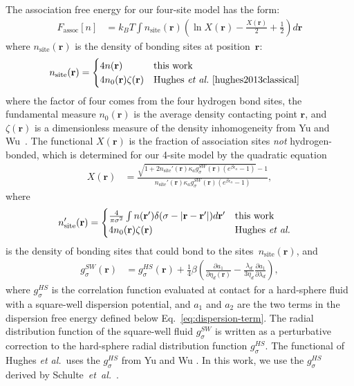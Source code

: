 \documentclass[twocolumn,amsmath,amssymb]{revtex4-1}
\newcommand{\rr}{\textbf{r}}
\newcommand{\xx}{\textbf{r}}
\newcommand\etadisp{\ensuremath{\eta_\textit{d}}}
\newcommand\epsilonassoc{\ensuremath{\epsilon_\textit{a}}}
\newcommand\kappaassoc{\ensuremath{\kappa_\textit{a}}}
\newcommand\lambdadisp{\ensuremath{\lambda_\textit{d}}}
\newcommand\hughesetal{Hughes \emph{et al.}}
\newcommand\hughesetalcite{Hughes \emph{et al.}~\cite{hughes2013classical}}
\begin{document}
The association free energy for our four-site model has the form:
\begin{align}
  F_\text{assoc}[n] &= k_BT \int n_\text{site}(\xx)
  \left(\ln X(\xx) - \frac{X(\xx)}{2} + \frac12\right) d\xx
\end{align}
where $n_\text{site}(\rr)$ is the density of bonding sites at
position~$\rr$:
\begin{align}
  n_\text{site}(\rr) &=
  \begin{cases}
    4 n(\rr) & \text{this work}\\
    4 n_0(\rr) \zeta(\rr) & \text{\hughesetalcite}
  \end{cases}
\end{align}
where the factor of four comes from the four hydrogen bond sites, the
fundamental measure $n_0(\rr)$ is the average density contacting point
$\rr$, and $\zeta(\xx)$ is a dimensionless measure of the density
inhomogeneity from Yu and
Wu~\cite{yu2002fmt-dft-inhomogeneous-associating}.  The functional
$X(\rr)$ is the fraction of association sites \emph{not}
hydrogen-bonded, which is determined for our 4-site model by the
quadratic equation
\begin{align}
  X(\xx) &= \frac{\sqrt{1 + 2n_\text{site}'(\rr)
      \kappaassoc g^\textit{SW}_\sigma(\xx)
  \left(e^{\beta\epsilonassoc} - 1\right)} - 1}
  {n_\text{site}'(\rr)
    \kappaassoc g^\textit{SW}_\sigma(\xx)
  \left(e^{\beta\epsilonassoc} - 1\right)}, \label{eq:X}
\end{align}
where
\begin{align}
  n_\text{site}'(\rr) &=
  \begin{cases}
    \frac{4}{\pi\sigma^2} \int n(\rr')\delta(\sigma - |\rr-\rr'|) d\rr' & \text{this work}\\
    4 n_0(\rr) \zeta(\rr) & \text{\hughesetal}
  \end{cases} 
\end{align}
is the density of bonding sites that could bond to the sites~$n_\text{site}(\rr)$, and
\begin{align}
  g^\textit{SW}_\sigma(\xx) &= g^\textit{HS}_\sigma(\xx) +
  \frac{1}{4}\beta\left(\frac{\partial a_1}{\partial \etadisp(\xx)} -
  \frac{\lambdadisp}{3 \etadisp}\frac{\partial a_1}{\partial \lambdadisp}\right)\label{eq:gSW},
\end{align}
where $g^\textit{HS}_\sigma$ is the correlation function evaluated at
contact for a hard-sphere fluid with a square-well dispersion
potential, and $a_1$ and $a_2$ are the two terms in the dispersion
free energy defined below Eq.~\ref{eq:dispersion-term}.  The radial distribution function of the square-well
fluid $g^\textit{SW}_\sigma$ is written as a perturbative correction
to the hard-sphere radial distribution function
$g^\textit{HS}_\sigma$.  The functional of \hughesetal\ uses the
$g_\sigma^\textit{HS}$ from Yu and Wu
\cite{yu2002fmt-dft-inhomogeneous-associating}.  In this work, we use
the $g_\sigma^\textit{HS}$ derived by Schulte~\emph{et~al.}~\cite{schulte2012using}.
\end{document}
